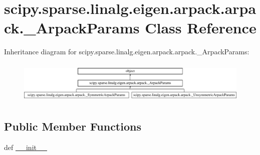 \hypertarget{classscipy_1_1sparse_1_1linalg_1_1eigen_1_1arpack_1_1arpack_1_1__ArpackParams}{}\section{scipy.\+sparse.\+linalg.\+eigen.\+arpack.\+arpack.\+\_\+\+Arpack\+Params Class Reference}
\label{classscipy_1_1sparse_1_1linalg_1_1eigen_1_1arpack_1_1arpack_1_1__ArpackParams}
Inheritance diagram for scipy.\+sparse.\+linalg.\+eigen.\+arpack.\+arpack.\+\_\+\+Arpack\+Params\+:\begin{figure}[H]
\begin{center}
\leavevmode
\includegraphics[height=2.038835cm]{classscipy_1_1sparse_1_1linalg_1_1eigen_1_1arpack_1_1arpack_1_1__ArpackParams}
\end{center}
\end{figure}
\subsection*{Public Member Functions}
\begin{DoxyCompactItemize}
\item 
def \hyperlink{classscipy_1_1sparse_1_1linalg_1_1eigen_1_1arpack_1_1arpack_1_1__ArpackParams_a698ce4af9894aa7cf584545d565c6971}{\+\_\+\+\_\+init\+\_\+\+\_\+}
\end{DoxyCompactItemize}
